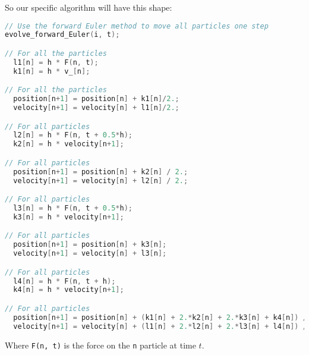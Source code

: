 So our specific algorithm will have this shape:
\begin{lstlisting}[language=C]
// Use the forward Euler method to move all particles one step
evolve_forward_Euler(i, t);

// For all the particles
  l1[n] = h * F(n, t);
  k1[n] = h * v_[n];

// For all the particles
  position[n+1] = position[n] + k1[n]/2.;
  velocity[n+1] = velocity[n] + l1[n]/2.;

// For all particles
  l2[n] = h * F(n, t + 0.5*h);
  k2[n] = h * velocity[n+1];

// For all particles
  position[n+1] = position[n] + k2[n] / 2.;
  velocity[n+1] = velocity[n] + l2[n] / 2.;

// For all particles
  l3[n] = h * F(n, t + 0.5*h);
  k3[n] = h * velocity[n+1];

// For all particles
  position[n+1] = position[n] + k3[n];
  velocity[n+1] = velocity[n] + l3[n];

// For all particles
  l4[n] = h * F(n, t + h);
  k4[n] = h * velocity[n+1];

// For all particles
  position[n+1] = position[n] + (k1[n] + 2.*k2[n] + 2.*k3[n] + k4[n]) / 6.;
  velocity[n+1] = velocity[n] + (l1[n] + 2.*l2[n] + 2.*l3[n] + l4[n]) / 6.;
\end{lstlisting}

Where \lstinline{F(n, t)} is the force on the \lstinline{n} particle at time $t$.
